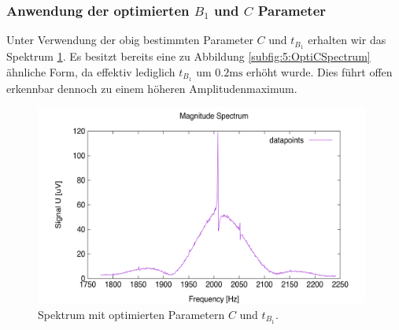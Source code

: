 \documentclass{article}
\begin{document}
        \subsubsection*{Anwendung der optimierten $B_1$ und $C$ Parameter}
            Unter Verwendung der obig bestimmten Parameter $C$ und $t_{B_1}$ erhalten wir das Spektrum \ref{fig:5:OptiSpectrum}. Es besitzt bereits eine zu Abbildung \ref{subfig:5:OptiCSpectrum} ähnliche Form, da effektiv lediglich $t_{B_1}$ um $0.2\si{\milli\second}$ erhöht wurde. Dies führt offen erkennbar dennoch zu einem höheren Amplitudenmaximum.
            \begin{figure}[H]
                \centering
                \includegraphics[width=11cm]{../Bilddateien/B1_Opti_Spectrum.png}
                \caption{Spektrum mit optimierten Parametern $C$ und $t_{B_1}$.}
                \label{fig:5:OptiSpectrum}
            \end{figure}


    
\end{document}
